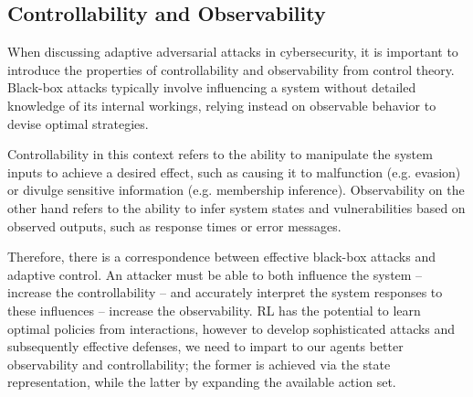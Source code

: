 \subsection{Controllability and Observability}
\label{sec:control}

When discussing adaptive adversarial attacks in cybersecurity, it is important to introduce the properties of controllability and observability from control theory.
Black-box attacks typically involve influencing a system without detailed knowledge of its internal workings, relying instead on observable behavior to devise optimal strategies.

Controllability in this context refers to the ability to manipulate the system inputs to achieve a desired effect, such as causing it to malfunction (e.g. evasion) or divulge sensitive information (e.g. membership inference).
Observability on the other hand refers to the ability to infer system states and vulnerabilities based on observed outputs, such as response times or error messages.

Therefore, there is a correspondence between effective black-box attacks and adaptive control.
An attacker must be able to both influence the system -- increase the controllability -- and accurately interpret the system responses to these influences -- increase the observability.
\gls{RL} has the potential to learn optimal policies from interactions, however to develop sophisticated attacks and subsequently effective defenses, we need to impart to our agents better observability and controllability; the former is achieved via the state representation, while the latter by expanding the available action set.
